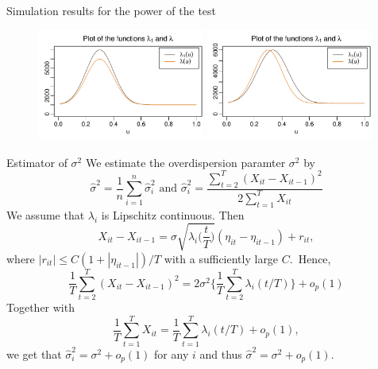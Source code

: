 \documentclass[10pt]{beamer}
\begin{document}
\begin{frame}{Simulation results for the power of the test}
\begin{figure}[t!]
	\includegraphics[width = 0.49\textwidth, height = 0.4\textheight]{plots/lambda_fcts_height}
	\onslide<2->\includegraphics[width = 0.49\textwidth, height = 0.4\textheight]{plots/lambda_fcts_shift}	
\end{figure}\pause
\vspace{-5mm}
{\scriptsize{\begin{table}[t]
\begin{center}
\caption{Power of the multiscale test for scenario A}
\label{tab:size_shape}

\end{center}
\end{table}}}
{
\vspace{-39.5mm}
\scriptsize{\begin{table}[t]
\begin{center}
\caption{Power of the multiscale test for scenario B}
\label{tab:size_shape}

\end{center}
\end{table}}}
\end{frame}

\begin{frame}[label = frame_sigma]{Estimator of ${\sigma}^2$}
We estimate the overdispersion paramter $\sigma^2$ by \[\widehat{\sigma}^2= \frac{1}{n} \sum_{i = 1}^n \hat{\sigma}_i^2 \text{ and } \hat{\sigma}_i^2 = \frac{\sum_{t=2}^T (X_{it}-X_{it-1})^2}{2 \sum_{t=1}^T X_{it}}\] \pause
We assume that $\lambda_i$ is Lipschitz continuous. Then
\[ X_{it} - X_{it-1} = \sigma \sqrt{\lambda_i\Big(\frac{t}{T}\Big)} (\eta_{it} - \eta_{it-1}) + r_{it}, \]
where $|r_{it}| \le C(1+|\eta_{it-1}|)/T$ with a sufficiently large $C$.\pause \, Hence,
\[ \frac{1}{T} \sum_{t=2}^T (X_{it} - X_{it-1})^2 = 2 \sigma^2 \Big\{ \frac{1}{T} \sum_{t=2}^T \lambda_i(t/T) \Big\} + o_p(1)\] \pause
Together with \[ \frac{1}{T} \sum_{t=1}^T X_{it} = \frac{1}{T} \sum_{t=1}^T \lambda_i(t/T) + o_p(1), \] we get that $\hat{\sigma}_i^2 = \sigma^2 + o_p(1)$ for any $i$ and thus $\hat{\sigma}^2 = \sigma^2 + o_p(1)$. \hyperlink{frame_teststatistic<4>}{}
\end{frame}
\end{document}
